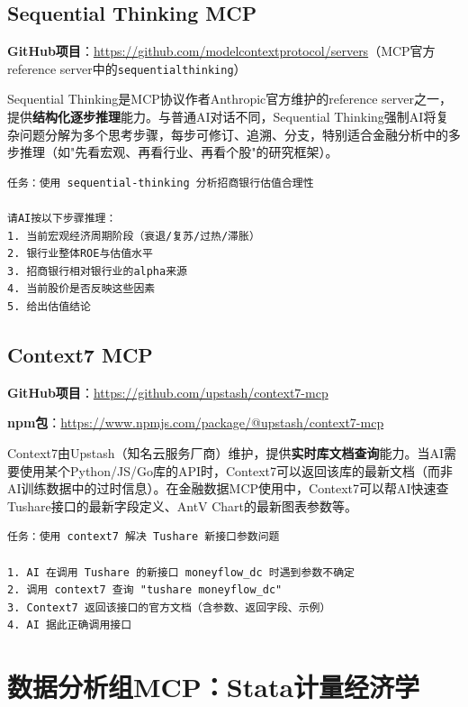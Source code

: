 \subsection{Sequential Thinking MCP}

\textbf{GitHub项目}：\url{https://github.com/modelcontextprotocol/servers}（MCP官方reference server中的\texttt{sequentialthinking}）

Sequential Thinking是MCP协议作者Anthropic官方维护的reference server之一，提供\textbf{结构化逐步推理}能力。与普通AI对话不同，Sequential Thinking强制AI将复杂问题分解为多个思考步骤，每步可修订、追溯、分支，特别适合金融分析中的多步推理（如"先看宏观、再看行业、再看个股"的研究框架）。

\begin{lstlisting}
任务：使用 sequential-thinking 分析招商银行估值合理性

请AI按以下步骤推理：
1. 当前宏观经济周期阶段（衰退/复苏/过热/滞胀）
2. 银行业整体ROE与估值水平
3. 招商银行相对银行业的alpha来源
4. 当前股价是否反映这些因素
5. 给出估值结论
\end{lstlisting}

\subsection{Context7 MCP}

\textbf{GitHub项目}：\url{https://github.com/upstash/context7-mcp}

\textbf{npm包}：\url{https://www.npmjs.com/package/@upstash/context7-mcp}

Context7由Upstash（知名云服务厂商）维护，提供\textbf{实时库文档查询}能力。当AI需要使用某个Python/JS/Go库的API时，Context7可以返回该库的最新文档（而非AI训练数据中的过时信息）。在金融数据MCP使用中，Context7可以帮AI快速查Tushare接口的最新字段定义、AntV Chart的最新图表参数等。

\begin{lstlisting}
任务：使用 context7 解决 Tushare 新接口参数问题

1. AI 在调用 Tushare 的新接口 moneyflow_dc 时遇到参数不确定
2. 调用 context7 查询 "tushare moneyflow_dc"
3. Context7 返回该接口的官方文档（含参数、返回字段、示例）
4. AI 据此正确调用接口
\end{lstlisting}

\section{数据分析组MCP：Stata计量经济学}

